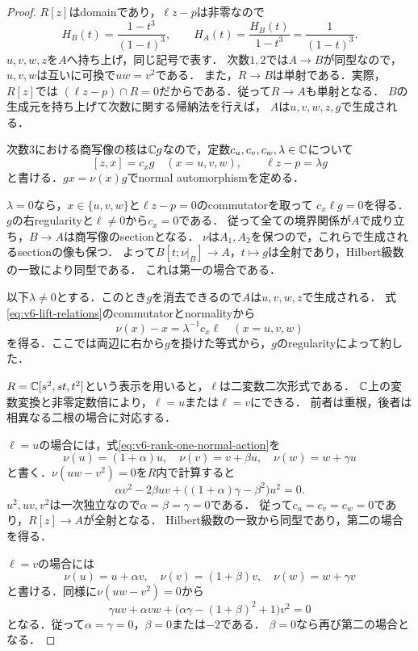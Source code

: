 \documentclass[11pt,a4paper]{ltjsarticle}
\begin{document}
\begin{proof}
$R[z]$はdomainであり，$\ell z-p$は非零なので
\[
 H_B(t)=\frac{1-t^3}{(1-t)^3},\qquad
 H_A(t)=\frac{H_B(t)}{1-t^3}=\frac1{(1-t)^3}.
\]
$u,v,w,z$を$A$へ持ち上げ，同じ記号で表す．
次数$1,2$では$A\to B$が同型なので，$u,v,w$は互いに可換で$uw=v^2$である．
また，$R\to B$は単射である．実際，$R[z]$では
$(\ell z-p)\cap R=0$だからである．従って$R\to A$も単射となる．
$B$の生成元を持ち上げて次数に関する帰納法を行えば，
$A$は$u,v,w,z,g$で生成される．

次数$3$における商写像の核は$\mathbb C g$なので，定数$c_u,c_v,c_w,\lambda\in\mathbb C$について
\begin{equation}\label{eq:v6-lift-relations}
 [z,x]=c_xg\quad(x=u,v,w),\qquad \ell z-p=\lambda g
\end{equation}
と書ける．$gx=\nu(x)g$でnormal automorphismを定める．

$\lambda=0$なら，$x\in\{u,v,w\}$と$\ell z-p=0$のcommutatorを取って
$c_x\ell g=0$を得る．$g$の右regularityと$\ell\ne0$から$c_x=0$である．
従って全ての境界関係が$A$で成り立ち，$B\to A$は商写像のsectionとなる．
$\nu$は$A_1,A_2$を保つので，これらで生成されるsectionの像も保つ．
よって$B[t;\nu|_B]\to A$，$t\mapsto g$は全射であり，Hilbert級数の一致により同型である．
これは第一の場合である．

以下$\lambda\ne0$とする．このとき$g$を消去できるので$A$は$u,v,w,z$で生成される．
式\eqref{eq:v6-lift-relations}のcommutatorとnormalityから
\begin{equation}\label{eq:v6-rank-one-normal-action}
 \nu(x)-x=\lambda^{-1}c_x\ell\quad(x=u,v,w)
\end{equation}
を得る．ここでは両辺に右から$g$を掛けた等式から，$g$のregularityによって約した．

$R=\mathbb C[s^2,st,t^2]$という表示を用いると，$\ell$は二変数二次形式である．
$\mathbb C$上の変数変換と非零定数倍により，$\ell=u$または$\ell=v$にできる．
前者は重根，後者は相異なる二根の場合に対応する．

$\ell=u$の場合には，式\eqref{eq:v6-rank-one-normal-action}を
\[
 \nu(u)=(1+\alpha)u,\quad\nu(v)=v+\beta u,
 \quad\nu(w)=w+\gamma u
\]
と書く．$\nu(uw-v^2)=0$を$R$内で計算すると
\[
 \alpha v^2-2\beta uv+
 \bigl((1+\alpha)\gamma-\beta^2\bigr)u^2=0.
\]
$u^2,uv,v^2$は一次独立なので$\alpha=\beta=\gamma=0$である．
従って$c_u=c_v=c_w=0$であり，$R[z]\to A$が全射となる．
Hilbert級数の一致から同型であり，第二の場合を得る．

$\ell=v$の場合には
\[
 \nu(u)=u+\alpha v,\quad\nu(v)=(1+\beta)v,
 \quad\nu(w)=w+\gamma v
\]
と書ける．同様に$\nu(uw-v^2)=0$から
\[
 \gamma uv+\alpha vw+
 \bigl(\alpha\gamma-(1+\beta)^2+1\bigr)v^2=0
\]
となる．従って$\alpha=\gamma=0$，$\beta=0$または$-2$である．
$\beta=0$なら再び第二の場合となる．


\end{proof}
\end{document}
